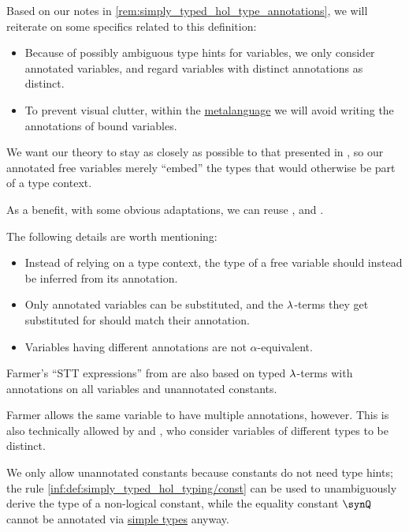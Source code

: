 \begin{comments}
  \item Based on our notes in \cref{rem:simply_typed_hol_type_annotations}, we will reiterate on some specifics related to this definition:
  \begin{itemize}
    \item Because of possibly ambiguous type hints for variables, we only consider annotated variables, and regard variables with distinct annotations as distinct.
    \item To prevent visual clutter, within the \hyperref[con:metalingual_abbreviation]{metalanguage} we will avoid writing the annotations of bound variables.
  \end{itemize}

  \item We want our theory to stay as closely as possible to that presented in , so our annotated free variables merely \enquote{embed} the types that would otherwise be part of a type context.

  As a benefit, with some obvious adaptations, we can reuse ,  and .

  The following details are worth mentioning:
  \begin{itemize}
    \item Instead of relying on a type context, the type of a free variable should instead be inferred from its annotation.
    \item Only annotated variables can be substituted, and the \( {\mathrm \lambda} \)-terms they get substituted for should match their annotation.
    \item Variables having different annotations are not \( \alpha \)-equivalent.
  \end{itemize}

  \item Farmer's \enquote{STT expressions} from \cite[270]{Farmer2008STTVirtues} are also based on typed \( {\mathrm \lambda} \)-terms with annotations on all variables and unannotated constants.

  Farmer allows the same variable to have multiple annotations, however. This is also technically allowed by  and , who consider variables of different types to be distinct.

  \item We only allow unannotated constants because constants do not need type hints; the rule \ref{inf:def:simply_typed_hol_typing/const} can be used to unambiguously derive the type of a non-logical constant, while the equality constant \( \synQ \) cannot be annotated via \hyperref[def:simple_type]{simple types} anyway.
\end{comments}

